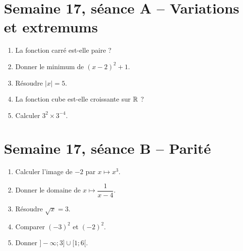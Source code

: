 \section{Semaine 17, séance A -- Variations et extremums}
\begin{enumerate}
  \item La fonction carré est-elle paire ?
  \item Donner le minimum de $(x-2)^2+1$.
  \item Résoudre $|x|=5$.
  \item La fonction cube est-elle croissante sur $\mathbb{R}$ ?
  \item Calculer $3^2\times3^{-4}$.
\end{enumerate}

\section{Semaine 17, séance B -- Parité}
\begin{enumerate}
  \item Calculer l'image de $-2$ par $x\mapsto x^3$.
  \item Donner le domaine de $x\mapsto\dfrac1{x-4}$.
  \item Résoudre $\sqrt{x}=3$.
  \item Comparer $(-3)^2$ et $(-2)^2$.
  \item Donner $]-\infty;3]\cup[1;6[$.
\end{enumerate}
\TeacherOnly{%
\begin{tcolorbox}[colback=VE!3,colframe=VE!35,boxrule=.4pt,arc=1mm]
\small\textit{Réponses.}\quad \textbf{1.} $-8$. \quad \textbf{2.} $\R\setminus\{4\}$. \quad \textbf{3.} $x=9$. \quad \textbf{4.} $9>4$. \quad \textbf{5.} $]-\infty;6[$.
\end{tcolorbox}}

